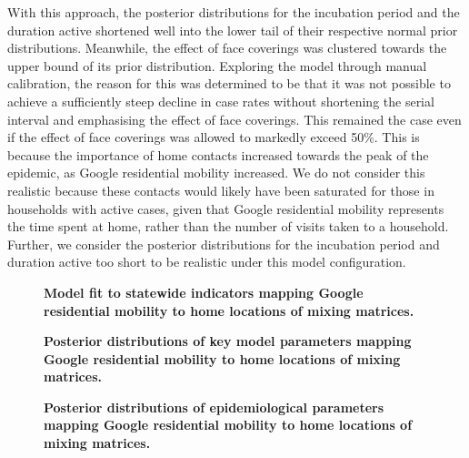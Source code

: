 With this approach, the posterior distributions for the incubation period and the duration active shortened well into the lower tail of their respective normal prior distributions. Meanwhile, the effect of face coverings was clustered towards the upper bound of its prior distribution. Exploring the model through manual calibration, the reason for this was determined to be that it was not possible to achieve a sufficiently steep decline in case rates without shortening the serial interval and emphasising the effect of face coverings. This remained the case even if the effect of face coverings was allowed to markedly exceed 50\%. This is because the importance of home contacts increased towards the peak of the epidemic, as Google residential mobility increased. We do not consider this realistic because these contacts would likely have been saturated for those in households with active cases, given that Google residential mobility represents the time spent at home, rather than the number of visits taken to a household. Further, we consider the posterior distributions for the incubation period and duration active too short to be realistic under this model configuration.

\begin{figure}[ht]
    \caption{\textbf{Model fit to statewide indicators mapping Google residential mobility to home locations of mixing matrices.}}
    \label{fig:residential_sensitivity_outputs}
\end{figure}

\begin{figure}[ht]
    \caption{\textbf{Posterior distributions of key model parameters mapping Google residential mobility to home locations of mixing matrices.}}
    \label{fig:residential_sensitivity_key_params}
\end{figure}

\begin{figure}[ht]
    \caption{\textbf{Posterior distributions of epidemiological parameters mapping Google residential mobility to home locations of mixing matrices.}}
    \label{fig:residential_sensitivity_epi_params}
\end{figure}
